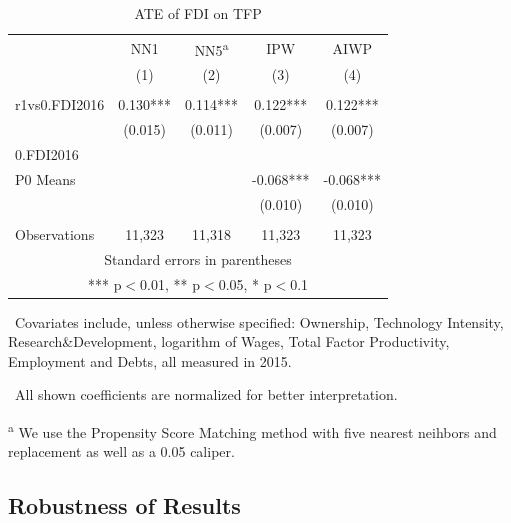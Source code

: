\documentclass[a4paper,11pt]{scrartcl}
\begin{document}
\begin{table}
 \centering
   \caption{ATE of FDI on TFP}
\begin{tabular}{lcccc} \hline
 & NN1 & NN5\textsuperscript{a} & IPW & AIWP \\
 & (1) & (2) & (3)  & (4) \\ \hline
 &  &  &  &    \\
r1vs0.FDI2016 & 0.130*** & 0.114*** & 0.122***  & 0.122***   \\
 & (0.015) & (0.011) & (0.007) &   (0.007)  \\
0.FDI2016 &  &  &  &    \\
P0 Means & & & -0.068*** & -0.068***\\
&  &  & (0.010)  &  (0.010) \\
&  &  &  &    \\
 Observations & 11,323 & 11,318 & 11,323 & 11,323 \\ \hline
\multicolumn{5}{c}{ Standard errors in parentheses} \\
\multicolumn{5}{c}{ *** p$<$0.01, ** p$<$0.05, * p$<$0.1} \\
\end{tabular}
\begin{tablenotes}
      \tiny
	\item\ Covariates include, unless otherwise specified: Ownership, Technology Intensity, Research\&Development, logarithm of Wages, Total Factor Productivity, Employment and Debts, all measured in 2015. 
	\item\ All shown coefficients are normalized for better interpretation. 
	\item\textsuperscript{a} We use the Propensity Score Matching method with five nearest neihbors and replacement as well as a 0.05 caliper. 
\end{tablenotes}
\end{table}



\subsection{Robustness of Results}
\end{document}
